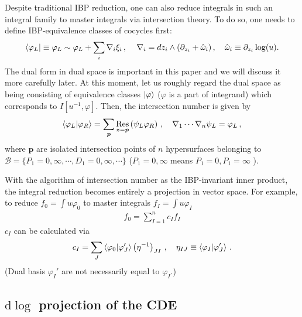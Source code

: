 \documentclass[a4paper,11pt]{article}
\newcommand{\nd}{\mathrm{d}}
\DeclareMathOperator{\Res}{Res}
\begin{document}
Despite traditional IBP reduction, one can also reduce integrals in such an integral family to master integrals via intersection theory.
To do so, one needs to define IBP-equivalence classes of cocycles \cite{Mastrolia:2018uzb, Frellesvig:2019uqt, Mizera:2019ose, Chestnov:2022xsy} first:
\begin{equation}
\bra{\varphi_L} \equiv \varphi_L \sim \varphi_L + \sum_i \nabla_i \xi_i \,, \, \quad \nabla_{i} = dz_i \wedge (\partial_{z_i} + \hat{\omega}_i) \, , \quad \hat{\omega}_i \equiv \partial_{z_i} \log(u) . \label{eq:braket}
\end{equation}
The dual form in dual space is important in this paper and we will discuss  it more carefully later. At this moment, let us roughly regard the dual space as being consisting of equivalence classes $\ket{\varphi}$ ($\varphi$ is a part of integrand) which corresponds to $I[u^{-1},\varphi]$.
Then, the intersection number is given by
\begin{equation}
	\braket{\varphi_L|\varphi_R} = \sum_{\bm{p}} \Res_{\bm{z} = \bm{p}} \left(\psi_L \varphi_R\right) \, , \quad \nabla_1 \cdots \nabla_n \psi_L = \varphi_L \,, \label{eq:intnum}
\end{equation}
where  $\bm{p}$ are isolated intersection points of  $n$  hypersurfaces belonging to $\mathcal{B}=\{P_1=0,\infty,\cdots, D_1=0,\infty,\cdots\}$ ($P_1=0,\infty$ means $P_1=0, P_1=\infty$ ).

With the algorithm of intersection number as the IBP-invariant inner product, the integral reduction becomes entirely a projection in vector space. For example, to reduce $f_0=\int u \varphi_0$ to master integrals $f_I=\int u \varphi_I$
\begin{align}
f_0=\sum_{I=1}^n c_I f_I
\end{align}
$c_I$ can be calculated via
\begin{align}
c_I=\sum_J \braket{\varphi_0|\varphi_J'}\left(\eta^{-1}\right)_{JI} \,, \quad \eta_{IJ}\equiv \braket{\varphi_I|\varphi_J'} \, .
\end{align}
(Dual basis $\varphi_I'$ are not necessarily equal to $\varphi_I$.)



\subsection{$\nd \log$ projection of the CDE} \label{sec:intnum}
\end{document}
